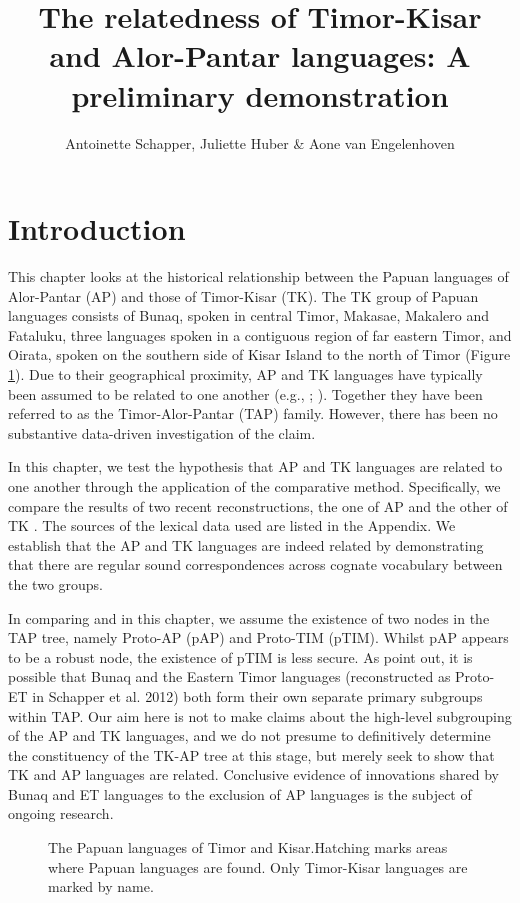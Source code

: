 \documentclass[output=paper]{LSP/langsci}
\title{The relatedness of Timor-Kisar and Alor-Pantar languages: A preliminary demonstration}
\author{Antoinette Schapper, Juliette Huber \& Aone van Engelenhoven}
\begin{document}
\section{Introduction}\label{sec:3:1} 

This chapter looks at the historical relationship between the Papuan languages of Alor-Pantar (AP) and those of Timor-Kisar (TK). The TK group of Papuan languages consists of Bunaq, spoken in central Timor, Makasae, Makalero and Fataluku, three languages spoken in a contiguous region of far eastern Timor, and Oirata, spoken on the southern side of Kisar Island to the north of Timor (Figure \ref{fig:3:Map1}). Due to their geographical proximity, AP and TK languages have typically been assumed to be related to one another (e.g., \citet{Stokhof1975}; \citet{Capell1975}). Together they have been referred to as the Timor-Alor-Pantar (TAP) family. However, there has been no substantive data-driven investigation of the claim.

In this chapter, we test the hypothesis that AP and TK languages are related to one another through the application of the comparative method. Specifically, we compare the results of two recent reconstructions, the one of AP \citep{HoltonEtAl2012} and the other of TK \citep{SchapperEtAl2012}. The sources of the lexical data used are listed in the Appendix. We establish that the AP and TK languages are indeed related by demonstrating that there are regular sound correspondences across cognate vocabulary between the two groups. 

In comparing \citet{HoltonEtAl2012} and \citet{SchapperEtAl2012} in this chapter, we assume the existence of two nodes in the TAP tree, namely Proto-AP (pAP) and Proto-TIM (pTIM). Whilst pAP appears to be a robust node, the existence of pTIM is less secure. As \citet[227-228]{SchapperEtAl2012} point out, it is possible that Bunaq and the Eastern Timor languages (reconstructed as Proto-ET in Schapper et al. 2012) both form their own separate primary subgroups within TAP. Our aim here is not to make claims about the high-level subgrouping of the AP and TK languages, and we do not presume to definitively determine the constituency of the TK-AP tree at this stage, but merely seek to show that TK and AP languages are related. Conclusive evidence of innovations shared by Bunaq and ET languages to the exclusion of AP languages is the subject of ongoing research. 

\begin{figure} 
\caption{The Papuan languages of Timor and Kisar.Hatching marks areas where Papuan languages are found. Only Timor-Kisar languages are marked by name.}
\label{fig:3:Map1}
\end{figure}
\end{document}
